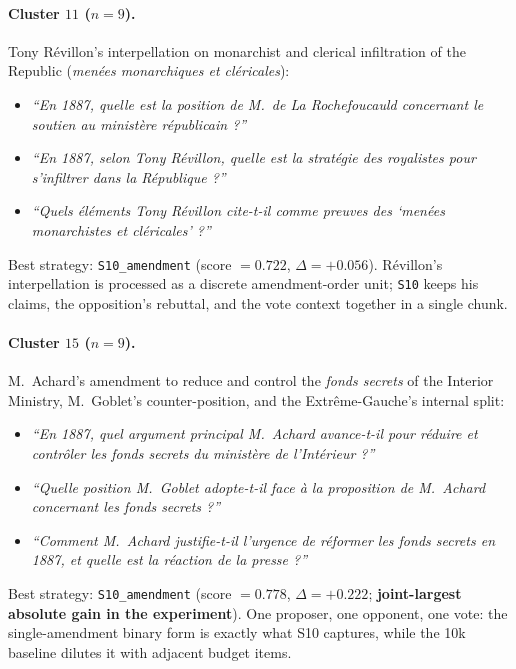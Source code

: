 \paragraph{Cluster $11$ ($n=9$).}
Tony R\'{e}villon's interpellation on monarchist and clerical infiltration of
the Republic (\emph{men\'{e}es monarchiques et cl\'{e}ricales}):
\begin{itemize}
  \item \textit{``En 1887, quelle est la position de M.~de La Rochefoucauld
    concernant le soutien au minist\`{e}re r\'{e}publicain ?''}
  \item \textit{``En 1887, selon Tony R\'{e}villon, quelle est la strat\'{e}gie
    des royalistes pour s'infiltrer dans la R\'{e}publique ?''}
  \item \textit{``Quels \'{e}l\'{e}ments Tony R\'{e}villon cite-t-il comme preuves
    des `men\'{e}es monarchistes et cl\'{e}ricales' ?''}
\end{itemize}
Best strategy: \texttt{S10\_amendment} (score $= 0.722$, $\Delta = +0.056$).
R\'{e}villon's interpellation is processed as a discrete amendment-order unit;
\texttt{S10} keeps his claims, the opposition's rebuttal, and the vote context
together in a single chunk.

\paragraph{Cluster $15$ ($n=9$).}
M.~Achard's amendment to reduce and control the \emph{fonds secrets} of the
Interior Ministry, M.~Goblet's counter-position, and the Extr\^{e}me-Gauche's
internal split:
\begin{itemize}
  \item \textit{``En 1887, quel argument principal M.~Achard avance-t-il pour
    r\'{e}duire et contr\^{o}ler les fonds secrets du minist\`{e}re de
    l'Int\'{e}rieur ?''}
  \item \textit{``Quelle position M.~Goblet adopte-t-il face \`{a} la proposition
    de M.~Achard concernant les fonds secrets ?''}
  \item \textit{``Comment M.~Achard justifie-t-il l'urgence de r\'{e}former les
    fonds secrets en 1887, et quelle est la r\'{e}action de la presse ?''}
\end{itemize}
Best strategy: \texttt{S10\_amendment} (score $= 0.778$, $\Delta = +0.222$;
\textbf{joint-largest absolute gain in the experiment}).
One proposer, one opponent, one vote: the single-amendment binary form is exactly
what S10 captures, while the 10k baseline dilutes it with adjacent budget items.


